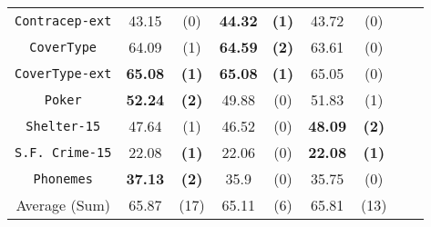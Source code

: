 \begin{table}
\begin{tabular}{c|cc|cc|cc|cc}
{\tt Contracep-ext} &  43.15       & (0)          &  {\bf 44.32} & {\bf (1)}    &  43.72       & (0)              &            &              \\
{\tt CoverType}     &  64.09       & (1)          &  {\bf 64.59} & {\bf (2)}    &  63.61       & (0)              &            &              \\
{\tt CoverType-ext} &  {\bf 65.08} & {\bf (1)}    &  {\bf 65.08} & {\bf (1)}    &  65.05       & (0)              &            &              \\
{\tt Poker}         &  {\bf 52.24} & {\bf (2)}    &  49.88       & (0)          &  51.83       & (1)              &            &              \\ 
{\tt Shelter-15}    &  47.64       & (1)          &  46.52       & (0)          & {\bf 48.09}  & {\bf (2)}        &            &              \\ 
{\tt S.F. Crime-15} &  22.08       & {\bf (1)}    &  22.06       & (0)          & {\bf 22.08}  & {\bf (1)}        &            &              \\   
{\tt Phonemes}      &  {\bf 37.13} & {\bf (2)}    &  35.9        & (0)          & 35.75        & (0)              &            &              \\
\hline
Average (Sum)       &  65.87       &  (17)        &  65.11       & (6)          & 65.81        & (13)             &            &
\end{tabular}
\normalsize
\label{tab:CrossVal-a}
\end{table}

